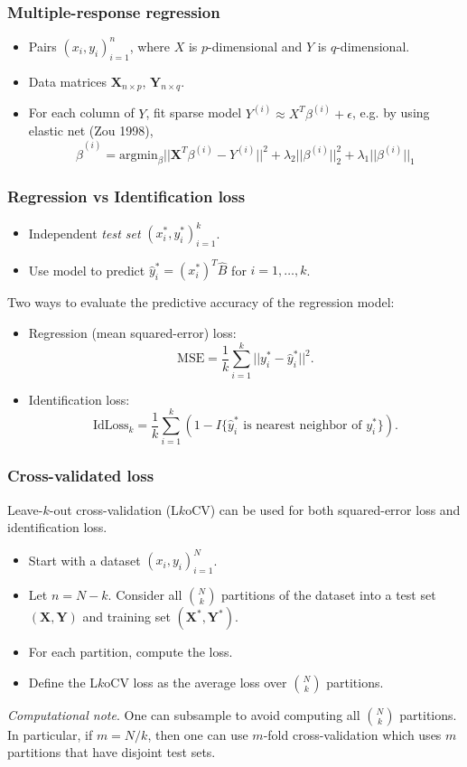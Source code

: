 \documentclass{beamer}
\newcommand{\bX}{\boldsymbol{X}}
\newcommand{\bY}{\boldsymbol{Y}}
\begin{document}
\begin{frame}
\frametitle{Multiple-response regression}
\begin{itemize}
\item Pairs $(x_i,y_i)_{i=1}^n$, where $X$ is $p$-dimensional and $Y$ is $q$-dimensional.
\item Data matrices $\bX_{n \times p}$, $\bY_{n \times q}$.
\item For each column of $Y$, fit sparse model $Y^{(i)} \approx X^T \beta^{(i)}  + \epsilon$, e.g. by using elastic net (Zou 1998), 
\[
\hat{\beta}^{(i)} = \text{argmin}_\beta ||\bX^T \beta^{(i)} - Y^{(i)}||^2 + \lambda_2 ||\beta^{(i)}||_2^2 + \lambda_1 ||\beta^{(i)}||_1
\]
\end{itemize}
\end{frame}


\begin{frame}
\frametitle{Regression vs Identification loss}
\begin{itemize}
\item Independent \emph{test set} $(x_i^*, y_i^*)_{i=1}^k$. 
\item Use model to predict $\hat{y}_i^* = (x_i^*)^T \hat{B}$ for $i = 1,\hdots, k$.
\end{itemize}
Two ways to evaluate the predictive accuracy of the regression model:
\begin{itemize}
\item Regression (mean squared-error) loss:
\[
\text{MSE} = \frac{1}{k} \sum_{i=1}^k ||y_i^* - \hat{y}_i^*||^2.
\]
\item Identification loss:
\[
\text{IdLoss}_k = \frac{1}{k} \sum_{i=1}^k (1 - I\{\hat{y}_i^* \text{ is nearest neighbor of }y_i^*\}).
\]
\end{itemize}
\end{frame}

\begin{frame}
\frametitle{Cross-validated loss}
Leave-$k$-out cross-validation (L$k$oCV) can be used for both squared-error loss and identification loss.
\begin{itemize}
\item Start with a dataset $(x_i,y_i)_{i=1}^N$.
\item Let $n = N-k$.  Consider all ${N}\choose{k}$ partitions of the dataset into a test set $(\bX, \bY)$ and training set $(\bX^*, \bY^*)$.
\item For each partition, compute the loss.
\item Define the L$k$oCV loss as the average loss over ${N}\choose{k}$ partitions.
\end{itemize}
\emph{Computational note}.  One can subsample to avoid computing all
${N}\choose{k}$ partitions.  In particular, if $m = N/k$, then one can
use $m$-fold cross-validation which uses $m$ partitions that have
disjoint test sets.
\end{frame}
\end{document}
